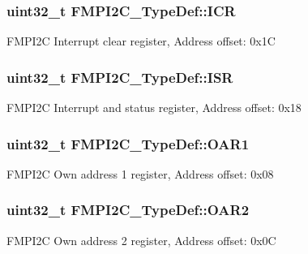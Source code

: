 \subsubsection[{\texorpdfstring{I\+CR}{ICR}}]{ uint32\+\_\+t F\+M\+P\+I2\+C\+\_\+\+Type\+Def\+::\+I\+CR}\hypertarget{struct_f_m_p_i2_c___type_def_abd0e6fed9da5869967e2570a84055143}{}\label{struct_f_m_p_i2_c___type_def_abd0e6fed9da5869967e2570a84055143}
F\+M\+P\+I2C Interrupt clear register, Address offset\+: 0x1C 
\subsubsection[{\texorpdfstring{I\+SR}{ISR}}]{ uint32\+\_\+t F\+M\+P\+I2\+C\+\_\+\+Type\+Def\+::\+I\+SR}\hypertarget{struct_f_m_p_i2_c___type_def_a343fdd6a2532f4ef56bf3f7a69a6e327}{}\label{struct_f_m_p_i2_c___type_def_a343fdd6a2532f4ef56bf3f7a69a6e327}
F\+M\+P\+I2C Interrupt and status register, Address offset\+: 0x18 
\subsubsection[{\texorpdfstring{O\+A\+R1}{OAR1}}]{ uint32\+\_\+t F\+M\+P\+I2\+C\+\_\+\+Type\+Def\+::\+O\+A\+R1}\hypertarget{struct_f_m_p_i2_c___type_def_ac71603691436249749d520945662c67a}{}\label{struct_f_m_p_i2_c___type_def_ac71603691436249749d520945662c67a}
F\+M\+P\+I2C Own address 1 register, Address offset\+: 0x08 
\subsubsection[{\texorpdfstring{O\+A\+R2}{OAR2}}]{ uint32\+\_\+t F\+M\+P\+I2\+C\+\_\+\+Type\+Def\+::\+O\+A\+R2}\hypertarget{struct_f_m_p_i2_c___type_def_ad0de14c40e6bd491429a5f488a5a8814}{}\label{struct_f_m_p_i2_c___type_def_ad0de14c40e6bd491429a5f488a5a8814}
F\+M\+P\+I2C Own address 2 register, Address offset\+: 0x0C 
